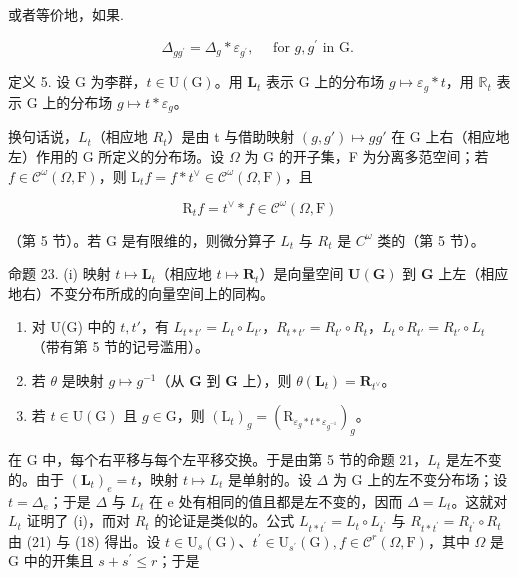 或者等价地，如果.

\[
\Delta_ {g g ^ {\prime}} = \Delta_ {g} * \varepsilon_ {g ^ {\prime}}, \quad \text { for   } g, g ^ {\prime} \text {   in   G. }
\]

定义 5. 设 G 为李群，\(t \in \mathrm{U}(\mathrm{G})\)。用 \(\mathbf{L}_t\) 表示 G 上的分布场 \(g \mapsto \varepsilon_g * t\)，用 \(\mathbb{R}_t\) 表示 G 上的分布场 \(g \mapsto t * \varepsilon_g\)。

换句话说，\(L_{t}\)（相应地 \(R_{t}\)）是由 t 与借助映射 \((g, g') \mapsto gg'\) 在 G 上右（相应地左）作用的 G 所定义的分布场。设 \(\Omega\) 为 G 的开子集，F 为分离多范空间；若 \(f \in \mathcal{C}^{\omega}(\Omega, \mathrm{F})\)，则 \(\mathrm{L}_{t}f = f * t^{\vee} \in \mathcal{C}^{\omega}(\Omega, \mathrm{F})\)，且

\[
\mathrm{R} _ {t} f = t ^ {\vee} * f \in \mathcal {C} ^ {\omega} (\Omega , \mathrm{F})
\]

（第 5 节）。若 G 是有限维的，则微分算子 \(L_{t}\) 与 \(R_{t}\) 是 \(C^{\omega}\) 类的（第 5 节）。

命题 23. (i) 映射 \(t \mapsto \mathbf{L}_t\)（相应地 \(t \mapsto \mathbf{R}_t\)）是向量空间 \(\mathbf{U}(\mathbf{G})\) 到 \(\mathbf{G}\) 上左（相应地右）不变分布所成的向量空间上的同构。

\begin{enumerate}
\def\labelenumi{(\roman{enumi})}
\setcounter{enumi}{1}
\item
  对 U(G) 中的 \(t, t'\)，有 \(L_{t*t'} = L_t \circ L_{t'}\)，\(R_{t*t'} = R_{t'} \circ R_t\)，\(L_t \circ R_{t'} = R_{t'} \circ L_t\)（带有第 5 节的记号滥用）。
\item
  若 \(\theta\) 是映射 \(g \mapsto g^{-1}\)（从 \(\mathbf{G}\) 到 \(\mathbf{G}\) 上），则 \(\theta(\mathbf{L}_t) = \mathbf{R}_{t^{\vee}}\)。
\item
  若 \(t \in \mathrm{U}(\mathrm{G})\) 且 \(g \in \mathrm{G}\)，则 \((\mathrm{L}_t)_g = (\mathrm{R}_{\varepsilon_g * t * \varepsilon_{g^{-1}}})_g\)。
\end{enumerate}

在 G 中，每个右平移与每个左平移交换。于是由第 5 节的命题 21，\(L_{t}\) 是左不变的。由于 \((\mathbf{L}_{t})_{e}=t\)，映射 \(t\mapsto L_{t}\) 是单射的。设 \(\Delta\) 为 G 上的左不变分布场；设 \(t=\Delta_{e}\)；于是 \(\Delta\) 与 \(L_{t}\) 在 e 处有相同的值且都是左不变的，因而 \(\Delta=L_{t}\)。这就对 \(L_{t}\) 证明了 (i)，而对 \(R_{t}\) 的论证是类似的。公式 \(L_{t*t^{\prime}}=L_{t}\circ L_{t^{\prime}}\) 与 \(R_{t*t^{\prime}}=R_{t^{\prime}}\circ R_{t}\) 由 (21) 与 (18) 得出。设 \(t\in\mathrm{U}_{s}(\mathrm{G})\)、\(t^{\prime}\in\mathrm{U}_{s^{\prime}}(\mathrm{G}), f\in\mathcal{C}^{r}(\Omega,\mathrm{F})\)，其中 \(\Omega\) 是 G 中的开集且 \(s+s^{\prime}\leqslant r\)；于是

